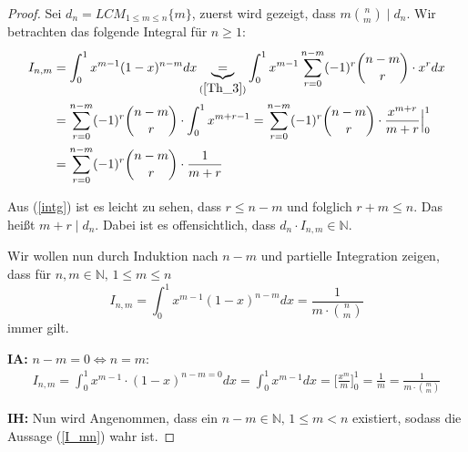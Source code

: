 \documentclass[12pt,oneside]{article}
\theoremstyle{remark}
\theoremstyle{definition}
\begin{document}
\begin{proof}
Sei $d_{n} = LCM_{1 \leq m \leq n}{\{m\}}$, zuerst wird  gezeigt, dass $m {n \choose m} \mid d_n$.\newline 
Wir betrachten das folgende Integral für $n \geq 1$:\newline
\begin{equation}\label{intg}
    \begin{split}
      \begin{aligned}
        I_{n,m}&= \int_{0}^{1} x^{m-1} (1-x)^{n - m} dx \underbrace{=}_{(\ref{Th_3})} \int_{0}^{1} x^{m-1} \sum_{r = 0}^{n - m} (-1)^r {n - m\choose r} \cdot x^r dx \\
        &= \sum_{r = 0}^{n - m}(-1)^r {n - m \choose r} \cdot \int_{0}^{1} x^{m + r - 1} 
        = \sum_{r = 0}^{n - m} (-1)^r {n - m \choose r} \cdot \frac{x^{m+r}}{m+r}\Big|_0^1\\
        &= \sum_{r = 0}^{n - m} (-1)^r {n - m \choose r} \cdot \frac{1}{m + r}
      \end{aligned}
    \end{split}
\end{equation}

Aus (\ref{intg}) ist es leicht zu sehen, dass $r \leq n - m $ und folglich $ r + m \leq n $. Das heißt $m + r \mid d_{n}$. Dabei ist es offensichtlich, dass $d_{n} \cdot I_{n,m} \in \mathbb{N}$.\newline\newline

Wir wollen nun durch Induktion nach $n - m$ und partielle Integration zeigen, dass für $n,m \in \mathbb{N}, \, 1 \leq  m \leq n$
\begin{equation}\label{I_mn}
    I_{n,m} = \int_{0}^{1} x^{m-1} (1-x)^{n - m} dx = \frac{1}{m \cdot {n \choose m}}
\end{equation}
immer gilt.\newline\newline


\textbf{IA:}
$n - m = 0 \iff n = m $:
\begin{align*}
    I_{n,m} =  \int_{0}^{1} x^{m - 1 } \cdot (1-x)^{n - m = 0} dx = \int_{0}^{1} x^{m - 1} dx = \Big[ \frac{x^m}{m}\Big]_0^1 = \frac{1}{m} = \frac{1}{m \cdot {m \choose m}}
\end{align*}

\textbf{IH:}
Nun wird Angenommen, dass ein $n - m \in \mathbb{N}, \, 1 \leq m < n$ existiert, sodass die Aussage (\ref{I_mn}) wahr ist.\newline\newline


\end{proof}
\end{document}
